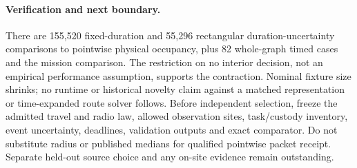 \documentclass[11pt]{article}
\begin{document}
\paragraph{Verification and next boundary.}
There are 155,520 fixed-duration and 55,296 rectangular
duration-uncertainty comparisons to pointwise physical occupancy,
plus 82 whole-graph timed cases and the mission comparison. The
restriction on no interior decision, not an empirical performance
assumption, supports the contraction. Nominal fixture size shrinks;
no runtime or historical novelty claim against a matched representation
or time-expanded route solver follows. Before independent selection,
freeze the admitted travel and radio law, allowed observation sites,
task/custody inventory, event uncertainty, deadlines, validation outputs
and exact comparator. Do not substitute radius or published medians
for qualified pointwise packet receipt. Separate held-out source choice
and any on-site evidence remain outstanding.
\end{document}
